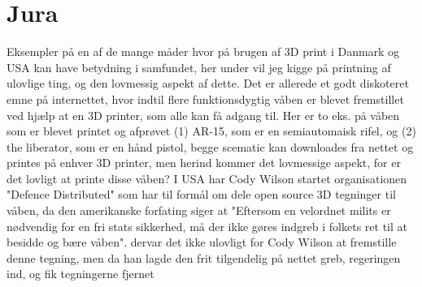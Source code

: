 \chapter{Jura}
Eksempler på en af de mange måder hvor på brugen af 3D print i Danmark og USA kan have betydning i samfundet, her under vil jeg kigge på printning af ulovlige ting, og den lovmessig aspekt af dette. Det er allerede et godt diskoteret emne på internettet, hvor indtil flere funktionsdygtig våben er blevet fremstillet ved hjælp at en 3D printer, som alle kan få adgang til. Her er to eks. på våben som er blevet printet og afprøvet (1) AR-15, som er en semiautomaisk rifel, og (2) the liberator, som er en hånd pistol, begge scematic kan downloades fra nettet og printes på enhver 3D printer, men herind kommer det lovmessige aspekt, for er det lovligt at printe disse våben?
I USA har Cody Wilson startet organisationen "Defence Distributed" som har til formål om dele open source 3D tegninger til våben, da den amerikanske forfating siger at "Eftersom en velordnet milits er nødvendig for en fri stats sikkerhed, må der ikke gøres indgreb i folkets ret til at besidde og bære våben". dervar det ikke ulovligt for Cody Wilson at fremstille denne tegning, men da han lagde den frit tilgendelig på nettet greb, regeringen ind, og fik tegningerne fjernet  